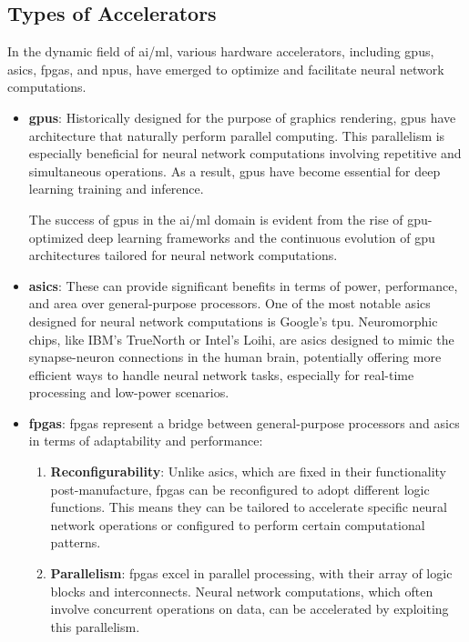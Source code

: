 \subsection{Types of Accelerators}

In the dynamic field of \gls{ai}/\gls{ml}, various hardware accelerators, including \glspl{gpu}, \glspl{asic}, \glspl{fpga}, and \glspl{npu}, have emerged to optimize and facilitate neural network computations.
\begin{itemize}
	\item \textbf{\glspl{gpu}}: Historically designed for the purpose of graphics rendering, \glspl{gpu} have architecture that naturally perform parallel computing. This parallelism is especially beneficial for neural network computations involving repetitive and simultaneous operations. As a result, \glspl{gpu} have become essential for deep learning training and inference.
	
	The success of \glspl{gpu} in the \gls{ai}/\gls{ml} domain is evident from the rise of \gls{gpu}-optimized deep learning frameworks and the continuous evolution of \gls{gpu} architectures tailored for neural network computations.
	
	
	\item \textbf{\glspl{asic}}: These can provide significant benefits in terms of power, performance, and area over general-purpose processors. One of the most notable \glspl{asic} designed for neural network computations is Google's \gls{tpu}. Neuromorphic chips, like IBM's TrueNorth or Intel's Loihi, are \glspl{asic} designed to mimic the synapse-neuron connections in the human brain, potentially offering more efficient ways to handle neural network tasks, especially for real-time processing and low-power scenarios.
	
	\item \textbf{\glspl{fpga}}: \glspl{fpga} represent a bridge between general-purpose processors and \glspl{asic} in terms of adaptability and performance:
	
	\begin{enumerate}
		\item \textbf{Reconfigurability}: Unlike \glspl{asic}, which are fixed in their functionality post-manufacture, \glspl{fpga} can be reconfigured to adopt different logic functions. This means they can be tailored to accelerate specific neural network operations or configured to perform certain computational patterns.
		
		\item \textbf{Parallelism}: \glspl{fpga} excel in parallel processing, with their array of logic blocks and interconnects. Neural network computations, which often involve concurrent operations on data, can be accelerated by exploiting this parallelism.
		

\end{enumerate}
\end{itemize}
